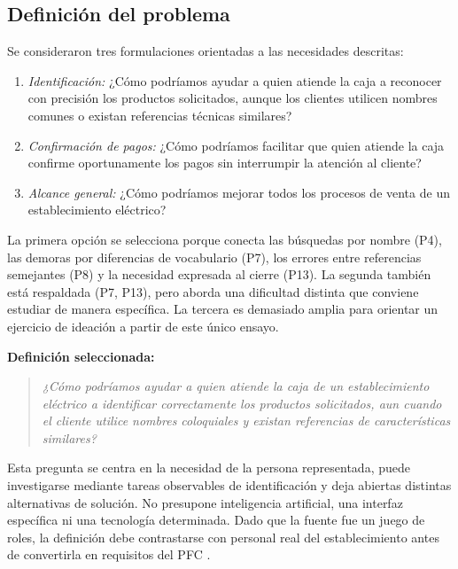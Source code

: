 \subsection{Definición del problema}

Se consideraron tres formulaciones orientadas a las necesidades descritas:
\begin{enumerate}
\item \emph{Identificación:} ¿Cómo podríamos ayudar a quien atiende la caja a reconocer con precisión los productos solicitados, aunque los clientes utilicen nombres comunes o existan referencias técnicas similares?
\item \emph{Confirmación de pagos:} ¿Cómo podríamos facilitar que quien atiende la caja confirme oportunamente los pagos sin interrumpir la atención al cliente?
\item \emph{Alcance general:} ¿Cómo podríamos mejorar todos los procesos de venta de un establecimiento eléctrico?
\end{enumerate}

La primera opción se selecciona porque conecta las búsquedas por nombre (P4), las demoras por diferencias de vocabulario (P7), los errores entre referencias semejantes (P8) y la necesidad expresada al cierre (P13). La segunda también está respaldada (P7, P13), pero aborda una dificultad distinta que conviene estudiar de manera específica. La tercera es demasiado amplia para orientar un ejercicio de ideación a partir de este único ensayo.

\noindent\textbf{Definición seleccionada:}
\begin{quote}
\emph{¿Cómo podríamos ayudar a quien atiende la caja de un establecimiento eléctrico a identificar correctamente los productos solicitados, aun cuando el cliente utilice nombres coloquiales y existan referencias de características similares?}
\end{quote}

Esta pregunta se centra en la necesidad de la persona representada, puede investigarse mediante tareas observables de identificación y deja abiertas distintas alternativas de solución. No presupone inteligencia artificial, una interfaz específica ni una tecnología determinada. Dado que la fuente fue un juego de roles, la definición debe contrastarse con personal real del establecimiento antes de convertirla en requisitos del PFC \cite{pohl2025,ireb2026}.
